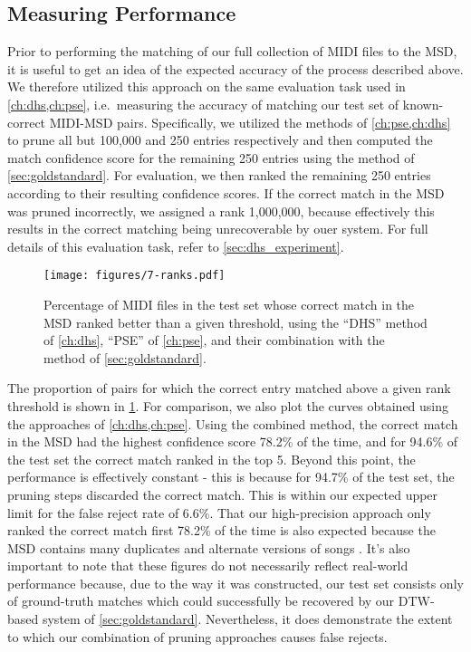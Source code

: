 \subsection{Measuring Performance}

Prior to performing the matching of our full collection of MIDI files to the MSD, it is useful to get an idea of the expected accuracy of the process described above.
We therefore utilized this approach on the same evaluation task used in \cref{ch:dhs,ch:pse}, i.e.\ measuring the accuracy of matching our test set of known-correct MIDI-MSD pairs.
Specifically, we utilized the methods of \cref{ch:pse,ch:dhs} to prune all but 100,000 and 250 entries respectively and then computed the match confidence score for the remaining 250 entries using the method of \cref{sec:goldstandard}.
For evaluation, we then ranked the remaining 250 entries according to their resulting confidence scores.
If the correct match in the MSD was pruned incorrectly, we assigned a rank 1,000,000, because effectively this results in the correct matching being unrecoverable by ouer system.
For full details of this evaluation task, refer to \cref{sec:dhs_experiment}.

\begin{figure}
  \texttt{[image: figures/7-ranks.pdf]}
  \caption[Percentage of the test set below a given rank]{Percentage of MIDI files in the test set whose correct match in the MSD ranked better than a given threshold, using the ``DHS'' method of \cref{ch:dhs}, ``PSE'' of \cref{ch:pse}, and their combination with the method of \cref{sec:goldstandard}.}
  \label{fig:combined_ranks}
\end{figure}

The proportion of pairs for which the correct entry matched above a given rank threshold is shown in \cref{fig:combined_ranks}.
For comparison, we also plot the curves obtained using the approaches of \cref{ch:dhs,ch:pse}.
Using the combined method, the correct match in the MSD had the highest confidence score 78.2\% of the time, and for 94.6\% of the test set the correct match ranked in the top 5.
Beyond this point, the performance is effectively constant - this is because for 94.7\% of the test set, the pruning steps discarded the correct match.
This is within our expected upper limit for the false reject rate of 6.6\%.
That our high-precision approach only ranked the correct match first 78.2\% of the time is also expected because the MSD contains many duplicates and alternate versions of songs \cite{bertin2012large}.
It's also important to note that these figures do not necessarily reflect real-world performance because, due to the way it was constructed, our test set consists only of ground-truth matches which could successfully be recovered by our DTW-based system of \cref{sec:goldstandard}.
Nevertheless, it does demonstrate the extent to which our combination of pruning approaches causes false rejects.

